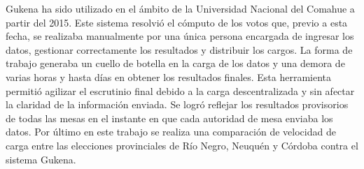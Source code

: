  Gukena ha sido utilizado en el ámbito de la Universidad Nacional del Comahue a partir del 2015. Este sistema resolvió el cómputo de los votos que, previo a esta fecha, se realizaba manualmente por una única persona encargada de ingresar los datos, gestionar correctamente los resultados y distribuir los cargos. La forma de trabajo generaba un cuello de botella en la carga de los datos y una demora de varias horas y hasta días en obtener los resultados finales.\newline
 Esta herramienta permitió agilizar el escrutinio final debido a la carga descentralizada y sin afectar la claridad de la información enviada. Se logró reflejar los resultados provisorios de todas las mesas en el instante en que cada autoridad de mesa enviaba los datos. \newline
 Por último en este trabajo se realiza una comparación de velocidad de carga entre las elecciones provinciales de Río Negro, Neuquén y Córdoba contra el sistema Gukena. 

\vfill
\pagebreak
